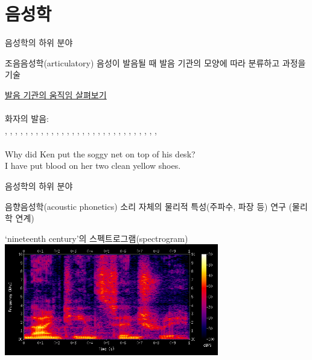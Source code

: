 \documentclass[11pt, aspectratio=169]{beamer}
\newcommand{\textds}[1]{{\ipafont #1}}
\begin{document}
\section{음성학}

\begin{frame}[t]{음성학의 하위 분야}
    \begin{block}{조음음성학(articulatory)}
        음성이 발음될 때 발음 기관의 모양에 따라 분류하고 과정을 기술
    \end{block}
    \href{https://youtu.be/DcNMCB-Gsn8}{\underline{발음 기관의 움직임 살펴보기}} \\
     \\
    화자의 발음: \\
    \textds{[həpɛ]}, 
    \textds{[hətɛ]}, 
    \textds{[həkɛ]}, 
    \textds{[həpɑ]}, 
    \textds{[hətɑ]}, 
    \textds{[həkɑ]}, 
    \textds{[hədɛ]}, 
    \textds{[hənɛ]}, 
    \textds{[həsɛ]}, 
    \textds{[həzɛ]}, 
    \textds{[həsɑ]}, 
    \textds{[hɛp]}, 
    \textds{[hɛt]}, 
    \textds{[hɛk]}, 
    \textds{[hɑp]}, 
    \textds{[hɑt]}, 
    \textds{[hɑk]}, 
    \textds{[həti]}, 
    \textds{[hətɪ]}, 
    \textds{[hətæ]}, 
    \textds{[hətʊ]}, 
    \textds{[hətu]}, 
    \textds{[hətɛt]}, 
    \textds{[hətɑt]}, 
    \textds{[hətɛk]}, 
    \textds{[həpɛn]}, 
    \textds{[hidi]}, 
    \textds{[hida]}, 
    \textds{[higi]}, 
    \textds{[higɑ]}, 
    \textds{[iɑ]}\\
     \\
    Why did Ken put the soggy net on top of his desk?\\
    I have put blood on her two clean yellow shoes.

\end{frame}

\begin{frame}[t]{음성학의 하위 분야}
    \begin{block}{음향음성학(acoustic phonetics) }
        소리 자체의 물리적 특성(주파수, 파장 등) 연구 (물리학 연계)
    \end{block}   
    ‘nineteenth century’의 스펙트로그램(spectrogram) \\ 
    \includegraphics[width=0.7\textwidth]{img/Spectrogram-19thC.png} 
\end{frame}
\end{document}
